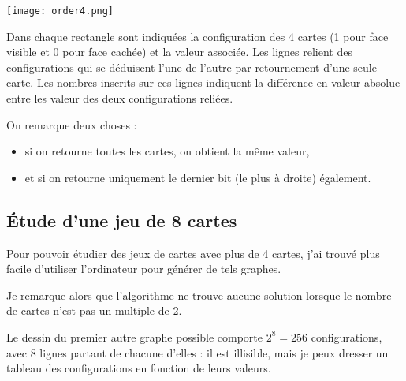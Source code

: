 \documentclass[10pt,a4paper,onecolumn]{article}
\begin{document}
\texttt{[image: order4.png]}

Dans chaque rectangle sont indiquées la configuration des 4 cartes (1 pour face visible et 0 pour face cachée) et la valeur associée. Les lignes relient des configurations qui se déduisent l'une de l'autre par retournement d'une seule carte. Les nombres inscrits sur ces lignes indiquent la différence en valeur absolue entre les valeur des deux configurations reliées.

On remarque deux choses :
\begin{itemize}
\item si on retourne toutes les cartes, on obtient la même valeur,
\item et si on retourne uniquement le dernier bit (le plus à droite) également.
\end{itemize}

\subsection{Étude d'une jeu de 8 cartes}
Pour pouvoir étudier des jeux de cartes avec plus de 4 cartes, j'ai trouvé plus facile d'utiliser l'ordinateur pour générer de tels graphes. %

Je remarque alors que l'algorithme ne trouve aucune solution lorsque le nombre de cartes n'est pas un multiple de 2.

Le dessin du premier autre graphe possible comporte $2^8 = 256$ configurations, avec 8 lignes partant de chacune d'elles : il est illisible, mais je peux dresser un tableau des configurations en fonction de leurs valeurs.
\end{document}
